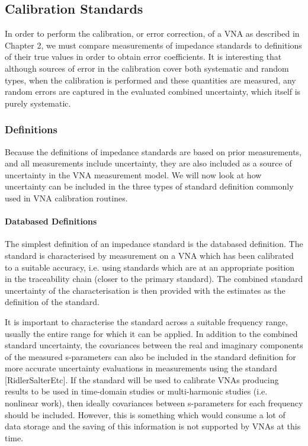\documentclass[../thesis/thesis.tex]{subfiles}
\begin{document}
\begin{refsection}
\subsection{Calibration Standards}

In order to perform the calibration, or error correction, of a VNA as described in Chapter 2, we must compare measurements of impedance standards to definitions of their true values in order to obtain error coefficients. It is interesting that although sources of error in the calibration cover both systematic and random types, when the calibration is performed and these quantities are measured, any random errors are captured in the evaluated combined uncertainty, which itself is purely systematic.

\subsubsection{Definitions}

Because the definitions of impedance standards are based on prior measurements, and all measurements include uncertainty, they are also included as a source of uncertainty in the VNA measurement model. We will now look at how uncertainty can be included in the three types of standard definition commonly used in VNA calibration routines.

\paragraph{Databased Definitions}

The simplest definition of an impedance standard is the databased definition. The standard is characterised by measurement on a VNA which has been calibrated to a suitable accuracy, i.e. using standards which are at an appropriate position in the traceability chain (closer to the primary standard). The combined standard uncertainty of the characterisation is then provided with the estimates as the definition of the standard.

It is important to characterise the standard across a suitable frequency range, usually the entire range for which it can be applied. In addition to the combined standard uncertainty, the covariances between the real and imaginary components of the measured s-parameters can also be included in the standard definition for more accurate uncertainty evaluations in measurements using the standard [RidlerSalterEtc]. If the standard will be used to calibrate VNAs producing results to be used in time-domain studies or multi-harmonic studies (i.e. nonlinear work), then ideally covariances between s-parameters for each frequency should be included. However, this is something which would consume a lot of data storage and the saving of this information is not supported by VNAs at this time.


\end{refsection}
\end{document}

